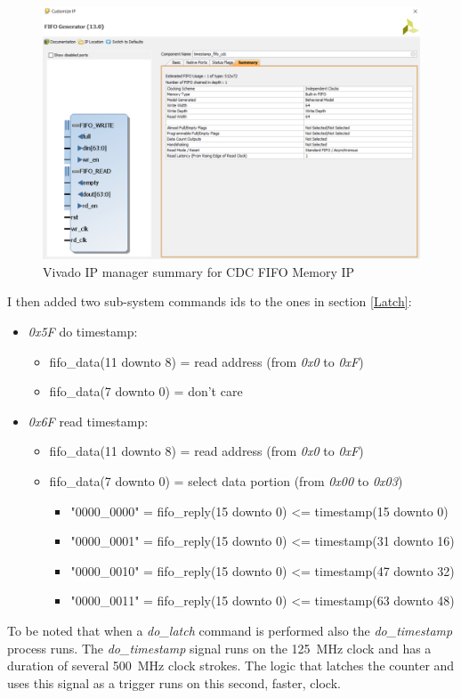\begin{figure}[H]
	\centering
	\includegraphics[width=0.6\linewidth]{IMG/ch4/FIFO_IP}
	\caption{Vivado IP manager summary for CDC FIFO Memory IP}
	\label{fig:fifo_ip}
\end{figure}
\noindent I then added two sub-system commands ids to the ones in section \ref{Latch}:
\begin{itemize}
	\item \textit{0x5F} do timestamp:
	\begin{itemize}
		\item fifo\_data(11 downto 8) = read address (from \textit{0x0} to \textit{0xF})
		\item fifo\_data(7 downto 0) = don't care
	\end{itemize}
	\item \textit{0x6F} read timestamp:
	\begin{itemize}
		\item fifo\_data(11 downto 8) = read address (from \textit{0x0} to \textit{0xF})
		\item fifo\_data(7 downto 0) = select data portion (from \textit{0x00} to \textit{0x03})
		\begin{itemize}
			\item "0000\_0000" = fifo\_reply(15 downto 0) <= timestamp(15 downto 0)
			\item "0000\_0001" = fifo\_reply(15 downto 0) <= timestamp(31 downto 16)
			\item "0000\_0010" = fifo\_reply(15 downto 0) <= timestamp(47 downto 32)
			\item "0000\_0011" = fifo\_reply(15 downto 0) <= timestamp(63 downto 48)
		\end{itemize}
	\end{itemize}
\end{itemize}
\noindent To be noted that when a \textit{do\_latch} command is performed also the \textit{do\_timestamp} process runs.
The \textit{do\_timestamp} signal runs on the 125~MHz clock and has a duration of several 500~MHz clock strokes. The logic that latches the counter and uses this signal as a trigger runs on this second, faster, clock.
